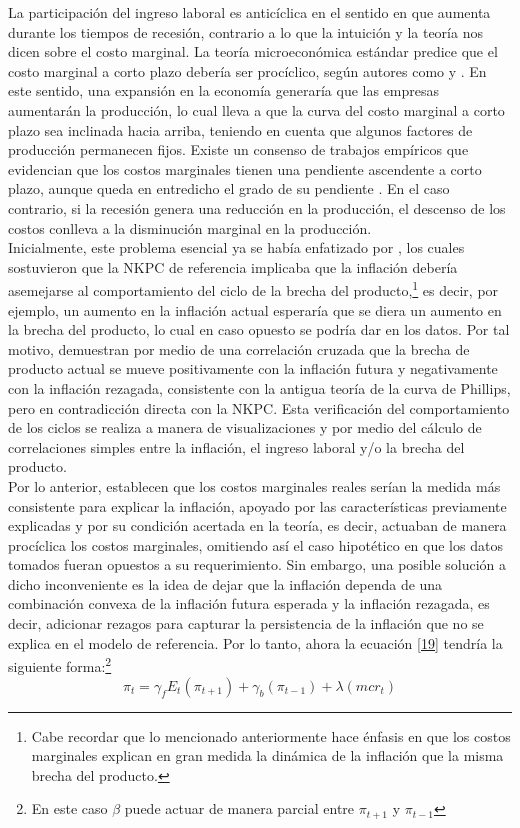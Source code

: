 La participación del ingreso laboral es anticíclica en el sentido en que aumenta durante los tiempos de recesión, contrario a lo que la intuición y la teoría nos dicen sobre el costo marginal. La teoría microeconómica estándar predice que el costo marginal a corto plazo debería ser procíclico, según autores como \cite{bils1987cyclical} y \cite{rotemberg1999cyclical}. En este sentido, una expansión en la economía generaría que las empresas aumentarán la producción, lo cual lleva a que la curva del costo marginal a corto plazo sea inclinada hacia arriba, teniendo en cuenta que algunos factores de producción permanecen fijos. Existe un consenso de trabajos empíricos que evidencian que los costos marginales tienen una pendiente ascendente a corto plazo, aunque queda en entredicho el grado de su pendiente  \citep{mazumder2010new}. En el caso contrario, si la recesión genera una reducción en la producción, el descenso de los costos conlleva a la disminución marginal en la producción.\\

Inicialmente, este problema esencial ya se había enfatizado por \cite{fuhrer1995inflation}, los cuales sostuvieron que la NKPC de referencia implicaba que la inflación debería asemejarse al comportamiento del ciclo de la brecha del producto,\footnote{Cabe recordar que lo mencionado anteriormente hace énfasis en que los costos marginales explican en gran medida la dinámica de la inflación que la misma brecha del producto.} es decir, por ejemplo, un aumento en la inflación actual esperaría que se diera un aumento en la brecha del producto, lo cual en caso opuesto se podría dar en los datos. Por tal motivo, \cite{gali1999inflation} demuestran por medio de una correlación cruzada que la  brecha de producto actual se mueve positivamente con la inflación futura y negativamente con la inflación rezagada, consistente con la antigua teoría de la curva de Phillips, pero en contradicción directa con la NKPC. Esta verificación del comportamiento de los ciclos se realiza a manera de visualizaciones y por medio del cálculo de correlaciones simples entre  la inflación, el ingreso laboral y/o la brecha del producto. \\

Por lo anterior, \cite{gali1999inflation}  establecen que los costos marginales reales serían la medida más consistente para explicar la inflación, apoyado por las características previamente explicadas y por su condición acertada en la teoría, es decir,  actuaban de manera procíclica los costos marginales, omitiendo así  el caso hipotético en que los datos tomados fueran opuestos a su requerimiento. Sin embargo, una posible solución a dicho inconveniente es la idea de dejar que la inflación dependa de una combinación convexa de la inflación futura esperada y la inflación rezagada, es decir,  adicionar rezagos para capturar la persistencia de la inflación que no se explica en el modelo de referencia. Por lo tanto, ahora la ecuación \eqref{19} tendría la siguiente forma:\footnote{En este caso $\beta$ puede actuar de manera parcial entre $\pi_{t+1}$ y $\pi_{t-1}$} 
\begin{equation}\label{21}
\pi_{t}= \gamma_{f}E_{t}(\pi_{t+1})+\gamma_{b}(\pi_{t-1})+\lambda(mcr_{t})
\end{equation}
 
